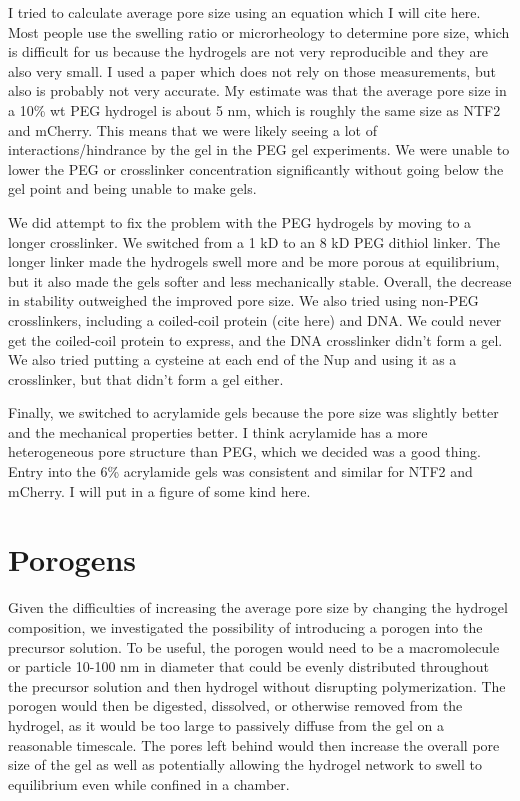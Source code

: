 I tried to calculate average pore size using an equation which I will cite here.  Most people use the swelling ratio or microrheology to determine pore size, which is difficult for us because the hydrogels are not very reproducible and they are also very small.  I used a paper which does not rely on those measurements, but also is probably not very accurate.  My estimate was that the average pore size in a 10\% wt PEG hydrogel is about 5 nm, which is roughly the same size as NTF2 and mCherry.  This means that we were likely seeing a lot of interactions/hindrance by the gel in the PEG gel experiments.  We were unable to lower the PEG or crosslinker concentration significantly without going below the gel point and being unable to make gels.

We did attempt to fix the problem with the PEG hydrogels by moving to a longer crosslinker.  We switched from a 1 kD to an 8 kD PEG dithiol linker.  The longer linker made the hydrogels swell more and be more porous at equilibrium, but it also made the gels softer and less mechanically stable.  Overall, the decrease in stability outweighed the improved pore size.  We also tried using non-PEG crosslinkers, including a coiled-coil protein (cite here) and DNA.  We could never get the coiled-coil protein to express, and the DNA crosslinker didn't form a gel.  We also tried putting a cysteine at each end of the Nup and using it as a crosslinker, but that didn't form a gel either.

Finally, we switched to acrylamide gels because the pore size was slightly better and the mechanical properties better.  I think acrylamide has a more heterogeneous pore structure than PEG, which we decided was a good thing.  Entry into the 6\% acrylamide gels was consistent and similar for NTF2 and mCherry.  I will put in a figure of some kind here.

\section{Porogens}

Given the difficulties of increasing the average pore size by changing the hydrogel composition, we investigated the possibility of introducing a porogen into the precursor solution.  To be useful, the porogen would need to be a macromolecule or particle 10-100 nm in diameter that could be evenly distributed throughout the precursor solution and then hydrogel without disrupting polymerization.  The porogen would then be digested, dissolved, or otherwise removed from the hydrogel, as it would be too large to passively diffuse from the gel on a reasonable timescale.  The pores left behind would then increase the overall pore size of the gel as well as potentially allowing the hydrogel network to swell to equilibrium even while confined in a chamber.

